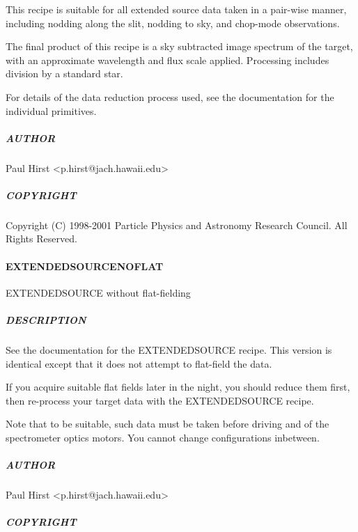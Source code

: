 \documentclass[twoside,11pt]{article}
\renewcommand{\_}{\texttt{\symbol{95}}}
\begin{document}
This recipe is suitable for all extended source data taken in a pair-wise
manner, including nodding along the slit, nodding to sky, and
chop-mode observations.



The final product of this recipe is a sky subtracted image spectrum of
the target, with an approximate wavelength and flux scale
applied. Processing includes division by a standard star.



For details of the data reduction process used, see the documentation
for the individual primitives.

\subparagraph*{AUTHOR\label{EXTENDED_SOURCE_AUTHOR}}

Paul Hirst <p.hirst@jach.hawaii.edu>

\subparagraph*{COPYRIGHT\label{EXTENDED_SOURCE_COPYRIGHT}}

Copyright (C) 1998-2001 Particle Physics and Astronomy Research
Council. All Rights Reserved.

\paragraph*{EXTENDED\_SOURCE\_NOFLAT\label{EXTENDED_SOURCE_NOFLAT}}

EXTENDED\_SOURCE without flat-fielding

\subparagraph*{DESCRIPTION\label{EXTENDED_SOURCE_NOFLAT_DESCRIPTION}}

See the documentation for the EXTENDED\_SOURCE recipe. This version is
identical except that it does not attempt to flat-field the data.



If you acquire suitable flat fields later in the night, you should
reduce them first, then re-process your target data with the
EXTENDED\_SOURCE recipe.



Note that to be suitable, such data must be taken before driving and
of the spectrometer optics motors. You cannot change configurations
inbetween.

\subparagraph*{AUTHOR\label{EXTENDED_SOURCE_NOFLAT_AUTHOR}}

Paul Hirst <p.hirst@jach.hawaii.edu>

\subparagraph*{COPYRIGHT\label{EXTENDED_SOURCE_NOFLAT_COPYRIGHT}}
\end{document}
